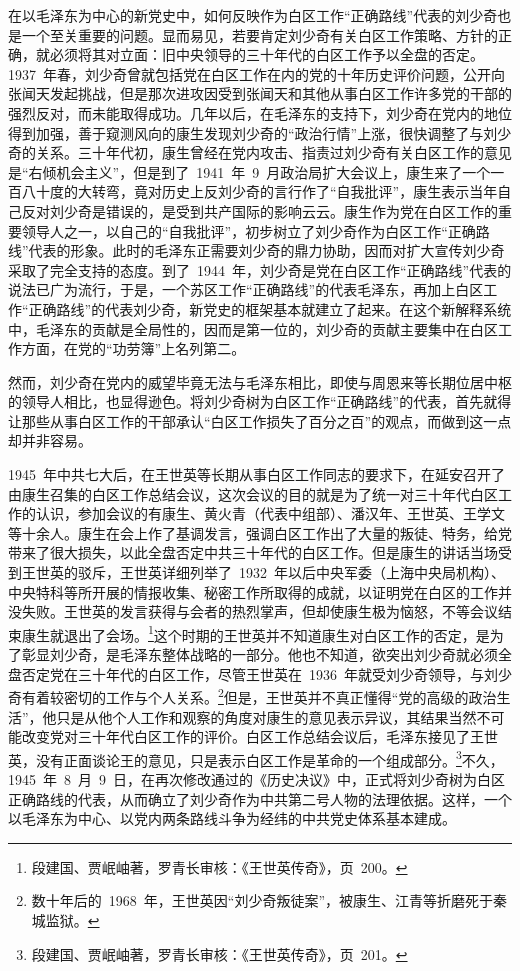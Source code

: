 在以毛泽东为中心的新党史中，如何反映作为白区工作“正确路线”代表的刘少奇也是一个至关重要的问题。显而易见，若要肯定刘少奇有关白区工作策略、方针的正确，就必须将其对立面：旧中央领导的三十年代的白区工作予以全盘的否定。1937~年春，刘少奇曾就包括党在白区工作在内的党的十年历史评价问题，公开向张闻天发起挑战，但是那次进攻因受到张闻天和其他从事白区工作许多党的干部的强烈反对，而未能取得成功。几年以后，在毛泽东的支持下，刘少奇在党内的地位得到加强，善于窥测风向的康生发现刘少奇的“政治行情”上涨，很快调整了与刘少奇的关系。三十年代初，康生曾经在党内攻击、指责过刘少奇有关白区工作的意见是“右倾机会主义”，但是到了~1941~年~9~月政治局扩大会议上，康生来了一个一百八十度的大转弯，竟对历史上反刘少奇的言行作了“自我批评”，康生表示当年自己反对刘少奇是错误的，是受到共产国际的影响云云。康生作为党在白区工作的重要领导人之一，以自己的“自我批评”，初步树立了刘少奇作为白区工作“正确路线”代表的形象。此时的毛泽东正需要刘少奇的鼎力协助，因而对扩大宣传刘少奇采取了完全支持的态度。到了~1944~年，刘少奇是党在白区工作“正确路线”代表的说法已广为流行，于是，一个苏区工作“正确路线”的代表毛泽东，再加上白区工作“正确路线”的代表刘少奇，新党史的框架基本就建立了起来。在这个新解释系统中，毛泽东的贡献是全局性的，因而是第一位的，刘少奇的贡献主要集中在白区工作方面，在党的“功劳簿”上名列第二。

然而，刘少奇在党内的威望毕竟无法与毛泽东相比，即使与周恩来等长期位居中枢的领导人相比，也显得逊色。将刘少奇树为白区工作“正确路线”的代表，首先就得让那些从事白区工作的干部承认“白区工作损失了百分之百”的观点，而做到这一点却并非容易。

1945~年中共七大后，在王世英等长期从事白区工作同志的要求下，在延安召开了由康生召集的白区工作总结会议，这次会议的目的就是为了统一对三十年代白区工作的认识，参加会议的有康生、黄火青（代表中组部）、潘汉年、王世英、王学文等十余人。康生在会上作了基调发言，强调白区工作出了大量的叛徒、特务，给党带来了很大损失，以此全盘否定中共三十年代的白区工作。但是康生的讲话当场受到王世英的驳斥，王世英详细列举了~1932~年以后中央军委（上海中央局机构）、中央特科等所开展的情报收集、秘密工作所取得的成就，以证明党在白区的工作并没失败。王世英的发言获得与会者的热烈掌声，但却使康生极为恼怒，不等会议结束康生就退出了会场。\footnote{段建国、贾岷岫著，罗青长审核：《王世英传奇》，页~200。}这个时期的王世英并不知道康生对白区工作的否定，是为了彰显刘少奇，是毛泽东整体战略的一部分。他也不知道，欲突出刘少奇就必须全盘否定党在三十年代的白区工作，尽管王世英在~1936~年就受刘少奇领导，与刘少奇有着较密切的工作与个人关系。\footnote{数十年后的~1968~年，王世英因“刘少奇叛徒案”，被康生、江青等折磨死于秦城监狱。}但是，王世英并不真正懂得“党的高级的政治生活”，他只是从他个人工作和观察的角度对康生的意见表示异议，其结果当然不可能改变党对三十年代白区工作的评价。白区工作总结会议后，毛泽东接见了王世英，没有正面谈论王的意见，只是表示白区工作是革命的一个组成部分。\footnote{段建国、贾岷岫著，罗青长审核：《王世英传奇》，页~201。}不久，1945~年~8~月~9~日，在再次修改通过的《历史决议》中，正式将刘少奇树为白区正确路线的代表，从而确立了刘少奇作为中共第二号人物的法理依据。这样，一个以毛泽东为中心、以党内两条路线斗争为经纬的中共党史体系基本建成。

